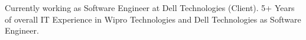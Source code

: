 

\begin{cvparagraph}

Currently working as Software Engineer at Dell Technologies (Client). 5+ Years of  overall  IT Experience in Wipro Technologies and Dell Technologies as Software Engineer.
\end{cvparagraph}

